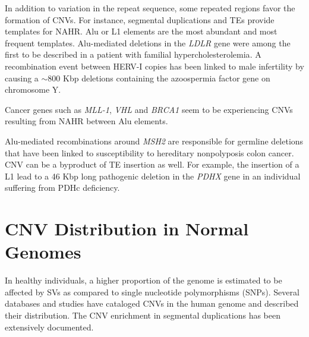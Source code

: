 In addition to variation in the repeat sequence, some repeated regions favor the formation of CNVs.
For instance, segmental duplications and TEs provide templates for NAHR.
Alu or L1 elements are the most abundant and most frequent templates.
Alu-mediated deletions in the {\it LDLR} gene were among the first to be described in a patient with familial hypercholesterolemia\cite{Lehrman1985}.
A recombination event between HERV-I copies has been linked to male infertility by causing a $\sim$800 Kbp deletions containing the azoospermia factor gene on chromosome Y\cite{Sun2000}.
\begin{comment}
  \citet{Sanchez-Valle2010} describe another example of HERV-mediated deletion associated with a disease, namely branchio-oto-renal syndrome caused by deletions in the eye absent homologue 1 gene ({\it EYA1}).
\end{comment}
Cancer genes such as {\it MLL-1}, {\it VHL} and {\it BRCA1} seem to be experiencing CNVs resulting from NAHR between Alu elements\cite{Belancio2009}.
\begin{comment}
  For example, Alu-mediated NAHR often creates tandem duplication of the {\it MLL} gene in acute myeloid leukemia.
\end{comment}
Alu-mediated recombinations around {\it MSH2} are responsible for germline deletions that have been linked to susceptibility to hereditary nonpolyposis colon cancer\cite{Li2006}.
CNV can be a byproduct of TE insertion as well. 
For example, the insertion of a L1 lead to a 46 Kbp long pathogenic deletion in the {\it PDHX} gene in an individual suffering from PDHc deficiency\cite{Mine2007}.
\begin{comment}
  Pyruvate dehydrogenase complex deficiency is one of the most common neurodegenerative disorders associated with abnormal mitochondrial metabolism. 
  Pyruvate dehydrogenase deficiency which results in neurological dysfunction and lactic acidosis in infancy and early childhood.
  PDHc deficiency often leads to Leigh disease.
\end{comment}


\section{CNV Distribution in Normal Genomes}

In healthy individuals, a higher proportion of the genome is estimated to be affected by SVs as compared to single nucleotide polymorphisms (SNPs)\cite{Pang2010}.
Several databases and studies have cataloged CNVs in the human genome and described their distribution.
The CNV enrichment in segmental duplications has been extensively documented.

